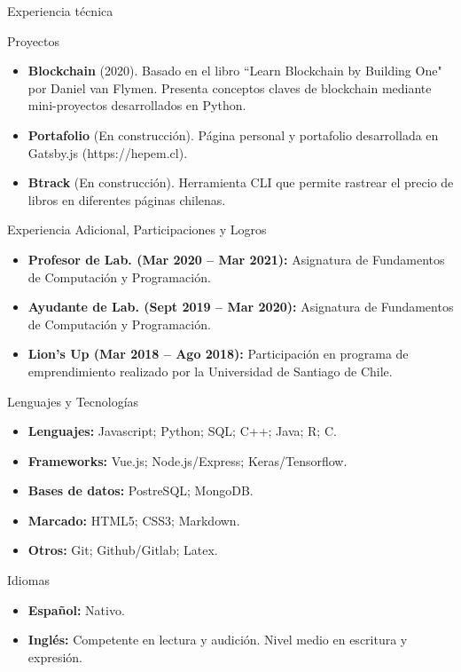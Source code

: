 \documentclass[]{mcdowellcv}
\begin{document}
	\begin{cvsection}{Experiencia técnica}
		\begin{cvsubsection}{Proyectos}{}{}
			\begin{itemize}
				\item \textbf{Blockchain} (2020). Basado en el libro ``Learn Blockchain by Building One" por Daniel van Flymen. Presenta conceptos claves de blockchain mediante mini-proyectos desarrollados en Python.
				\item \textbf{Portafolio} (En construcción). Página personal y portafolio desarrollada en Gatsby.js (https://hepem.cl).
				\item \textbf{Btrack} (En construcción). Herramienta CLI que permite rastrear el precio de libros en diferentes páginas chilenas.
			\end{itemize}
		\end{cvsubsection}
	\end{cvsection}
	
	\begin{cvsection}{Experiencia Adicional, Participaciones y Logros}
		\begin{cvsubsection}{}{}{}	
			\begin{itemize}
				\item \textbf{Profesor de Lab. (Mar 2020 – Mar 2021):} Asignatura de Fundamentos de Computación y Programación.
				\item \textbf{Ayudante de Lab. (Sept 2019 – Mar 2020):} Asignatura de Fundamentos de Computación y Programación.
				\item \textbf{Lion's Up (Mar 2018 – Ago 2018):} Participación en programa de emprendimiento realizado por la Universidad de Santiago de Chile.
			\end{itemize}
		\end{cvsubsection}
	\end{cvsection}
	
	\begin{cvsection}{Lenguajes y Tecnologías}
		\begin{cvsubsection}{}{}{}	
			\begin{itemize}
				\item \textbf{Lenguajes: } Javascript; Python; SQL; C++; Java; R; C. 
				\item \textbf{Frameworks: } Vue.js; Node.js/Express; Keras/Tensorflow. 
				\item \textbf{Bases de datos: } PostreSQL; MongoDB.
				\item \textbf{Marcado: } HTML5; CSS3; Markdown.
				\item \textbf{Otros: } Git; Github/Gitlab; Latex. 

			\end{itemize}
		\end{cvsubsection}
	\end{cvsection}

	\begin{cvsection}{Idiomas}
		\begin{cvsubsection}{}{}{}	
			\begin{itemize}
				\item \textbf{Español:} Nativo. 
				\item \textbf{Inglés:} Competente en lectura y audición. Nivel medio en escritura y expresión.
			\end{itemize}
		\end{cvsubsection}
	\end{cvsection}
	
\end{document}
